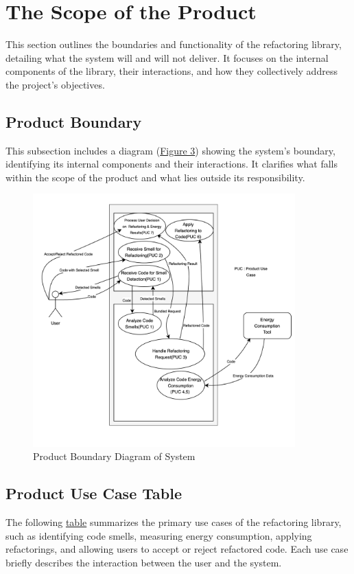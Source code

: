 \documentclass[12pt]{article}
\begin{document}
\section{The Scope of the Product}
This section outlines the boundaries and functionality of the
refactoring library, detailing what the system will and will not
deliver. It focuses on the internal components of the library, their
interactions, and how they collectively address the project's objectives.

\subsection{Product Boundary}
This subsection includes a diagram (\hyperref[img:prod-bound]{Figure
3}) showing the system's boundary, identifying its internal
components and their interactions. It clarifies what falls within the
scope of the product and what lies outside its responsibility.

\begin{figure}[H]
  \centering
  \includegraphics[width=0.9\textwidth]{../Images/use_case_diagram.png}
  \caption{Product Boundary Diagram of System}
  \label{img:prod-bound}
\end{figure}

\subsection{Product Use Case Table}
The following \hyperref[tab:puc]{table} summarizes the primary use
cases of the refactoring library, such as identifying code smells,
measuring energy consumption, applying refactorings, and allowing
users to accept or reject refactored code. Each use case briefly
describes the interaction between the user and the system.
\end{document}
